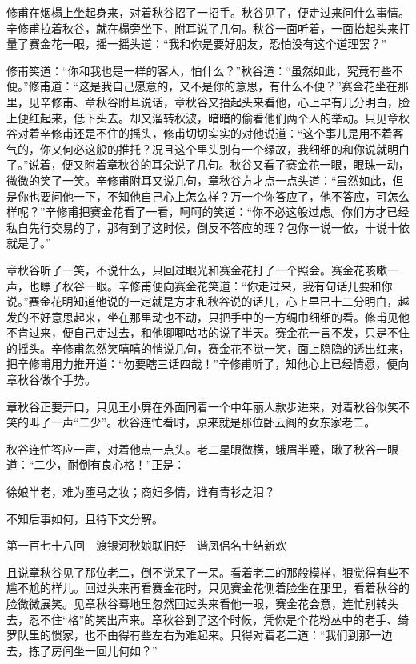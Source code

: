 \documentclass[12pt,UTF8]{ctexbook}
\begin{document}
{{{修甫在烟榻上坐起身来，对着秋谷招了一招手。秋谷见了，便走过来问什么事情。辛修甫拉着秋谷，就在榻旁坐下，附耳说了几句。秋谷一面听着，一面抬起头来打量了赛金花一眼，摇一摇头道：“我和你是要好朋友，恐怕没有这个道理罢？”

修甫笑道：“你和我也是一样的客人，怕什么？”秋谷道：“虽然如此，究竟有些不便。”修甫道：“这是我自己愿意的，又不是你的意思，有什么不便？”赛金花坐在那里，见辛修甫、章秋谷附耳说话，章秋谷又抬起头来看他，心上早有几分明白，脸上便红起来，低下头去。却又溜转秋波，暗暗的偷看他们两个人的举动。只见章秋谷对着辛修甫还是不住的摇头，修甫切切实实的对他说道：“这个事儿是用不着客气的，你又何必这般的推托？况且这个里头别有一个缘故，我细细的和你说就明白了。”说着，便又附着章秋谷的耳朵说了几句。秋谷又看了赛金花一眼，眼珠一动，微微的笑了一笑。辛修甫附耳又说几句，章秋谷方才点一点头道：“虽然如此，但是你也要问他一下，不知他自己心上怎么样？万一个你答应了，他不答应，可怎么样呢？”辛修甫把赛金花看了一看，呵呵的笑道：“你不必这般过虑。你们方才已经私自先行交易的了，那有到了这时候，倒反不答应的理？包你一说一依，十说十依就是了。”

章秋谷听了一笑，不说什么，只回过眼光和赛金花打了一个照会。赛金花咳嗽一声，也瞟了秋谷一眼。辛修甫便向赛金花笑道：“你走过来，我有句话儿要和你说。”赛金花明知道他说的一定就是方才和秋谷说的话儿，心上早已十二分明白，越发的不好意思起来，坐在那里动也不动，只把手中的一方绸巾细细的看。修甫见他不肯过来，便自己走过去，和他唧唧咕咕的说了半天。赛金花一言不发，只是不住的摇头。辛修甫忽然笑嘻嘻的悄说几句，赛金花不觉一笑，面上隐隐的透出红来，把辛修甫用力推开道：“勿要瞎三话四哉！”辛修甫听了，知他心上已经情愿，便向章秋谷做个手势。

章秋谷正要开口，只见王小屏在外面同着一个中年丽人款步进来，对着秋谷似笑不笑的叫了一声“二少”。秋谷连忙看时，原来就是那位卧云阁的女东家老二。

秋谷连忙答应一声，对着他点一点头。老二星眼微横，蛾眉半蹙，瞅了秋谷一眼道：“二少，耐倒有良心格！”正是：

徐娘半老，难为堕马之妆；商妇多情，谁有青衫之泪？

不知后事如何，且待下文分解。





第一百七十八回　渡银河秋娘联旧好　谐凤侣名士结新欢





且说章秋谷见了那位老二，倒不觉呆了一呆。看着老二的那般模样，狠觉得有些不尴不尬的样儿。回过头来再看赛金花时，只见赛金花侧着脸坐在那里，看着秋谷的脸微微展笑。见章秋谷蓦地里忽然回过头来看他一眼，赛金花会意，连忙别转头去，忍不住“格”的笑出声来。章秋谷到了这个时候，凭你是个花粉丛中的老手、绮罗队里的惯家，也不由得有些左右为难起来。只得对着老二道：“我们到那一边去，拣了房间坐一回儿何如？”

}}}
\end{document}

